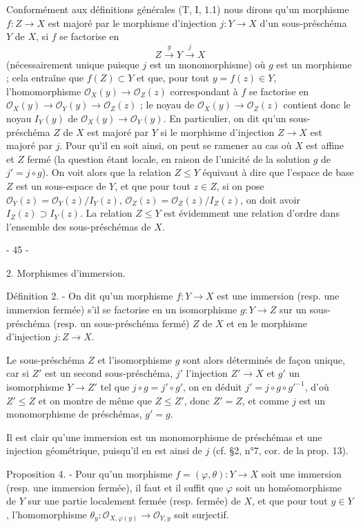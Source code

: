 Conformément aux définitions générales (T, I, 1.1) nous dirons qu'un morphisme $f : Z \to X$ est majoré par le morphisme d'injection $j : Y \to X$ d'un sous-préschéma $Y$ de $X$, si $f$ se factorise en
$$Z \xrightarrow{g} Y \xrightarrow{j} X$$
(nécessairement unique puisque $j$ est un monomorphisme) où $g$ est un morphisme ; cela entraîne que $f(Z) \subset Y$ et que, pour tout $y=f(z) \in Y$, l'homomorphisme $\mathcal{O}_X(y) \to \mathcal{O}_Z(z)$ correspondant à $f$ se factorise en $\mathcal{O}_X(y) \to \mathcal{O}_Y(y) \to \mathcal{O}_Z(z)$ ; le noyau de $\mathcal{O}_X(y) \to \mathcal{O}_Z(z)$ contient donc le noyau $I_Y(y)$ de $\mathcal{O}_X(y) \to \mathcal{O}_Y(y)$. En particulier, on dit qu'un sous-préschéma $Z$ de $X$ est majoré par $Y$ si le morphisme d'injection $Z \to X$ est majoré par $j$. Pour qu'il en soit ainsi, on peut se ramener au cas où $X$ est affine et $Z$ fermé (la question étant locale, en raison de l'unicité de la solution $g$ de $j'=j \circ g$). On voit alors que la relation $Z \le Y$ équivaut à dire que l'espace de base $Z$ est un sous-espace de $Y$, et que pour tout $z \in Z$, si on pose $\mathcal{O}_Y(z)=\mathcal{O}_Y(z)/I_Y(z)$, $\mathcal{O}_Z(z)=\mathcal{O}_Z(z)/I_Z(z)$, on doit avoir $I_Z(z) \supset I_Y(z)$. La relation $Z \le Y$ est évidemment une relation d'ordre dans l'ensemble des sous-préschémas de $X$.

\newpage


- 45 -

2. Morphismes d'immersion.

Définition 2. - On dit qu'un morphisme $f : Y \to X$ est une immersion (resp. une immersion fermée) s'il se factorise en un isomorphisme $g : Y \to Z$ sur un sous-préschéma (resp. un sous-préschéma fermé) $Z$ de $X$ et en le morphisme d'injection $j : Z \to X$.

Le sous-préschéma $Z$ et l'isomorphisme $g$ sont alors déterminés de façon unique, car si $Z'$ est un second sous-préschéma, $j'$ l'injection $Z' \to X$ et $g'$ un isomorphisme $Y \to Z'$ tel que $j \circ g = j' \circ g'$, on en déduit $j' = j \circ g \circ g'^{-1}$, d'où $Z' \leq Z$ et on montre de même que $Z \leq Z'$, donc $Z' = Z$, et comme $j$ est un monomorphisme de préschémas, $g' = g$.

Il est clair qu'une immersion est un monomorphisme de préschémas et une injection géométrique, puisqu'il en est ainsi de $j$ (cf. §2, n°7, cor. de la prop. 13).

Proposition 4. - Pour qu'un morphisme $f = (\varphi, \theta) : Y \to X$ soit une immersion (resp. une immersion fermée), il faut et il suffit que $\varphi$ soit un homéomorphisme de $Y$ sur une partie localement fermée (resp. fermée) de $X$, et que pour tout $y \in Y$, l'homomorphisme $\theta_y : \mathcal{O}_{X, \varphi(y)} \to \mathcal{O}_{Y, y}$ soit surjectif.

